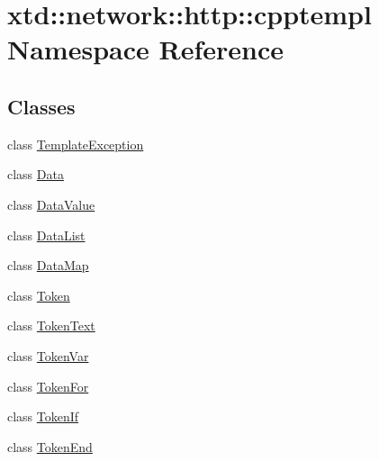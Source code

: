 \hypertarget{namespacextd_1_1network_1_1http_1_1cpptempl}{\section{xtd\-:\-:network\-:\-:http\-:\-:cpptempl Namespace Reference}
\label{namespacextd_1_1network_1_1http_1_1cpptempl}
}
\subsection*{Classes}
\begin{DoxyCompactItemize}
\item 
class \hyperlink{classxtd_1_1network_1_1http_1_1cpptempl_1_1TemplateException}{Template\-Exception}
\item 
class \hyperlink{classxtd_1_1network_1_1http_1_1cpptempl_1_1Data}{Data}
\item 
class \hyperlink{classxtd_1_1network_1_1http_1_1cpptempl_1_1DataValue}{Data\-Value}
\item 
class \hyperlink{classxtd_1_1network_1_1http_1_1cpptempl_1_1DataList}{Data\-List}
\item 
class \hyperlink{classxtd_1_1network_1_1http_1_1cpptempl_1_1DataMap}{Data\-Map}
\item 
class \hyperlink{classxtd_1_1network_1_1http_1_1cpptempl_1_1Token}{Token}
\item 
class \hyperlink{classxtd_1_1network_1_1http_1_1cpptempl_1_1TokenText}{Token\-Text}
\item 
class \hyperlink{classxtd_1_1network_1_1http_1_1cpptempl_1_1TokenVar}{Token\-Var}
\item 
class \hyperlink{classxtd_1_1network_1_1http_1_1cpptempl_1_1TokenFor}{Token\-For}
\item 
class \hyperlink{classxtd_1_1network_1_1http_1_1cpptempl_1_1TokenIf}{Token\-If}
\item 
class \hyperlink{classxtd_1_1network_1_1http_1_1cpptempl_1_1TokenEnd}{Token\-End}
\end{DoxyCompactItemize}
